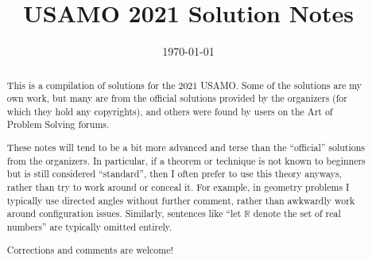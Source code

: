 \documentclass[11pt]{scrartcl}
\title{USAMO 2021 Solution Notes}
\date{\today}
\begin{document}
\maketitle

\begin{abstract}
This is a compilation of solutions
for the 2021 USAMO.
Some of the solutions are my own work,
but many are from the official solutions provided by the organizers
(for which they hold any copyrights),
and others were found by users on the Art of Problem Solving forums.

These notes will tend to be a bit more advanced and terse than the ``official''
solutions from the organizers.
In particular, if a theorem or technique is not known to beginners
but is still considered ``standard'', then I often prefer to
use this theory anyways, rather than try to work around or conceal it.
For example, in geometry problems I typically use directed angles
without further comment, rather than awkwardly work around configuration issues.
Similarly, sentences like ``let $\mathbb{R}$ denote the set of real numbers''
are typically omitted entirely.

Corrections and comments are welcome!
\end{abstract}

\tableofcontents
\newpage

\addtocounter{section}{-1}
\end{document}

